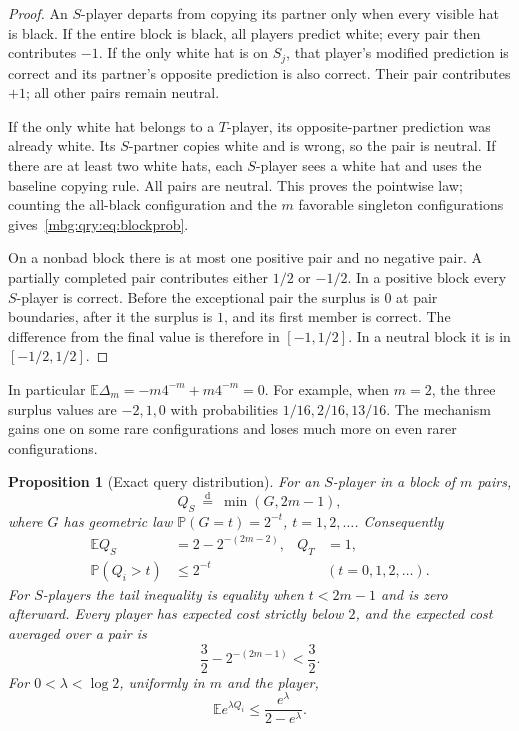 \documentclass[11pt,letterpaper]{article}
\newtheorem{proposition}[theorem]{Proposition}
\theoremstyle{definition}
\newcommand{\E}{\mathbb E}
\newcommand{\Prb}{\mathbb P}
\begin{document}
\begin{proof}
An \(S\)-player departs from copying its partner only when every visible
hat is black. If the entire block is black, all players predict white;
every pair then contributes \(-1\).
If the only white hat is on \(S_j\), that player's modified prediction
is correct and its partner's opposite prediction is also correct.
Their pair contributes \(+1\); all other pairs remain neutral.

If the only white hat belongs to a \(T\)-player, its opposite-partner
prediction was already white. Its \(S\)-partner copies white and is wrong,
so the pair is neutral. If there are at least two white hats, each
\(S\)-player sees a white hat and uses the baseline copying rule.
All pairs are neutral. This proves the pointwise law; counting the
all-black configuration and the \(m\) favorable singleton configurations
gives~\eqref{mbg:qry:eq:blockprob}.

On a nonbad block there is at most one positive pair and no negative pair.
A partially completed pair contributes either \(1/2\) or \(-1/2\).
In a positive block every \(S\)-player is correct. Before the exceptional
pair the surplus is \(0\)
at pair boundaries, after it the surplus is \(1\), and its first member
is correct. The difference from the final value is therefore in
\([-1,1/2]\). In a neutral block it is in \([-1/2,1/2]\).
\end{proof}

In particular \(\E\Delta_m=-m4^{-m}+m4^{-m}=0\).
For example, when \(m=2\), the three surplus values are
\(-2,1,0\) with probabilities \(1/16,2/16,13/16\).
The mechanism gains one on some rare configurations and loses much
more on even rarer configurations.

\begin{proposition}[Exact query distribution]
\label{mbg:qry:prop:cost}
For an \(S\)-player in a block of \(m\) pairs,
\[
 Q_S\ \stackrel{\mathrm d}{=}\ \min(G,2m-1),
\]
where \(G\) has geometric law
\(\Prb(G=t)=2^{-t}\), \(t=1,2,\ldots\).
Consequently
\begin{align}
 \E Q_S&=2-2^{-(2m-2)}, & Q_T&=1, \label{mbg:qry:eq:costmean}\\
 \Prb(Q_i>t)&\le2^{-t} &&
 (t=0,1,2,\ldots). \label{mbg:qry:eq:costtail}
\end{align}
For \(S\)-players the tail inequality is equality when \(t<2m-1\)
and is zero afterward. Every player has expected cost strictly below
\(2\), and the expected cost averaged over a pair is
\[
 \frac32-2^{-(2m-1)}<\frac32.
\]
For \(0<\lambda<\log2\), uniformly in \(m\) and the player,
\begin{equation}
 \E e^{\lambda Q_i}\le\frac{e^\lambda}{2-e^\lambda}.
 \label{mbg:qry:eq:mgf}
\end{equation}
\end{proposition}
\end{document}

